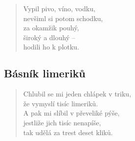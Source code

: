 \begin{multicols}{2}
\begin{verse}
Vypil pivo, víno, vodku,\\
nevšiml si potom schodku,\\
za okamžik pouhý,\\
široký a dlouhý --\\
hodili ho k plotku.
\end{verse}
	
\subsection{Básník limeriků}
	
\begin{verse}
Chlubil se mi jeden chlápek v triku,\\
že vymyslí tisíc limeriků.\\
A pak mi slíbil v převeliké pýše,\\
jestliže jich tisíc nenapíše,\\
tak udělá za trest deset kliků.
\end{verse}
	
\end{multicols}